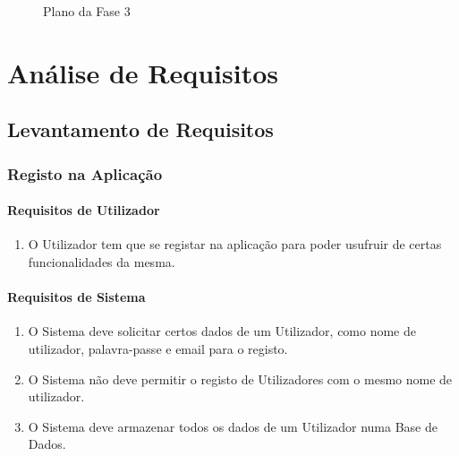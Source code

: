 \documentclass[a4paper,12pt]{scrreprt}
\begin{document}
        \begin{figure}[hbt!]
            \centering
            \caption{Plano da Fase 3}
        \end{figure}



\chapter{Análise de Requisitos}

\section{Levantamento de Requisitos}

\subsection{Registo na Aplicação}

\subsubsection{Requisitos de Utilizador}

\begin{enumerate}
    \item O Utilizador tem que se registar na aplicação para poder usufruir de certas funcionalidades da mesma.
\end{enumerate}

\subsubsection{Requisitos de Sistema }

\begin{enumerate}
    \item O Sistema deve solicitar certos dados de um Utilizador, como nome de utilizador, palavra-passe e email para o registo.
    \item O Sistema não deve permitir o registo de Utilizadores com o mesmo nome de utilizador.
    \item O Sistema deve armazenar todos os dados de um Utilizador numa Base de Dados.
\end{enumerate}
\end{document}
